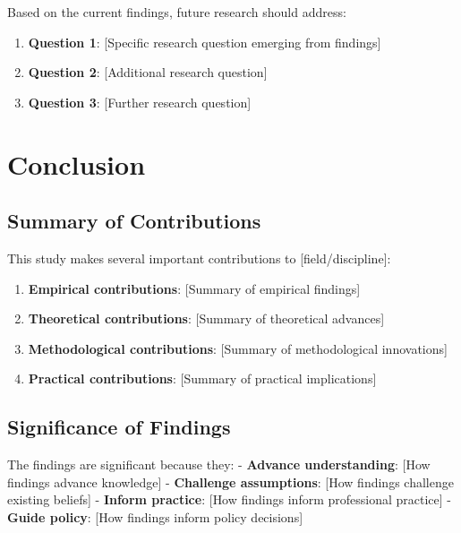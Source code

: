 \documentclass[
  12pt,
  letterpaper,
  12pt,
  letterpaper,
  oneside]{report}
\providecommand{\tightlist}{%
  \setlength{\itemsep}{0pt}\setlength{\parskip}{0pt}}
\begin{document}
Based on the current findings, future research should address:

\begin{enumerate}
\def\labelenumi{\arabic{enumi}.}
\tightlist
\item
  \textbf{Question 1}: {[}Specific research question emerging from
  findings{]}
\item
  \textbf{Question 2}: {[}Additional research question{]}
\item
  \textbf{Question 3}: {[}Further research question{]}
\end{enumerate}

\section{Conclusion}\label{conclusion}

\subsection{Summary of Contributions}\label{summary-of-contributions}

This study makes several important contributions to
{[}field/discipline{]}:

\begin{enumerate}
\def\labelenumi{\arabic{enumi}.}
\tightlist
\item
  \textbf{Empirical contributions}: {[}Summary of empirical findings{]}
\item
  \textbf{Theoretical contributions}: {[}Summary of theoretical
  advances{]}
\item
  \textbf{Methodological contributions}: {[}Summary of methodological
  innovations{]}
\item
  \textbf{Practical contributions}: {[}Summary of practical
  implications{]}
\end{enumerate}

\subsection{Significance of Findings}\label{significance-of-findings}

The findings are significant because they: - \textbf{Advance
understanding}: {[}How findings advance knowledge{]} - \textbf{Challenge
assumptions}: {[}How findings challenge existing beliefs{]} -
\textbf{Inform practice}: {[}How findings inform professional
practice{]} - \textbf{Guide policy}: {[}How findings inform policy
decisions{]}
\end{document}
